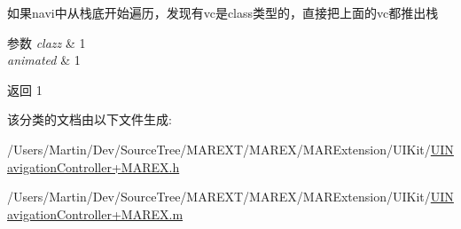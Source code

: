 如果navi中从栈底开始遍历，发现有vc是class类型的，直接把上面的vc都推出栈


\begin{DoxyParams}{参数}
{\em clazz} & 1 \\
\hline
{\em animated} & 1 \\
\hline
\end{DoxyParams}
\begin{DoxyReturn}{返回}
1 
\end{DoxyReturn}


该分类的文档由以下文件生成\+:\begin{DoxyCompactItemize}
\item 
/\+Users/\+Martin/\+Dev/\+Source\+Tree/\+M\+A\+R\+E\+X\+T/\+M\+A\+R\+E\+X/\+M\+A\+R\+Extension/\+U\+I\+Kit/\hyperlink{_u_i_navigation_controller_09_m_a_r_e_x_8h}{U\+I\+Navigation\+Controller+\+M\+A\+R\+E\+X.\+h}\item 
/\+Users/\+Martin/\+Dev/\+Source\+Tree/\+M\+A\+R\+E\+X\+T/\+M\+A\+R\+E\+X/\+M\+A\+R\+Extension/\+U\+I\+Kit/\hyperlink{_u_i_navigation_controller_09_m_a_r_e_x_8m}{U\+I\+Navigation\+Controller+\+M\+A\+R\+E\+X.\+m}\end{DoxyCompactItemize}
